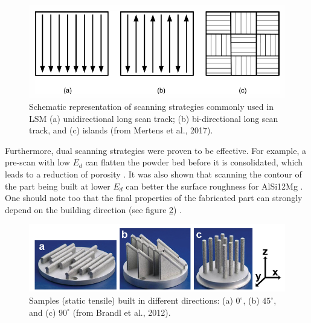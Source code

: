 \begin{figure}[h!]
\centering
\includegraphics[scale=0.6]{Images/Strat}
\decoRule
\caption[Schematic representation of scanning strategies commonly used in LSM (a) unidirectional long scan track; (b) bi-directional long scan track, and (c) islands]{Schematic representation of scanning strategies commonly used in LSM (a) unidirectional long scan track; (b) bi-directional long scan track, and (c) islands (from Mertens et al., 2017).}
\label{fig:Strat}
\end{figure}

Furthermore, dual scanning strategies were proven to be effective. For example, a pre-scan with low $E_d$ can flatten the powder bed before it is consolidated, which leads to a reduction of porosity \parencite{Mertens170406}. It was also shown that scanning the contour of the part being built at lower $E_d$ can better the surface roughness for AlSi12Mg \parencite{PRASHANTH170205}. One should note too that the final properties of the fabricated part can strongly depend on the building direction (see figure \ref{fig:Build}) \parencite{DELROISSE201732}.\\%

\begin{figure}[th]
\centering
\includegraphics[scale=0.58]{Images/Build}
\decoRule
\caption[Samples (static tensile) built in different directions: (a) $0^\circ$, (b) $45^\circ$, and (c) $90^\circ$]{Samples (static tensile) built in different directions: (a) $0^\circ$, (b) $45^\circ$, and (c) $90^\circ$ (from Brandl et al., 2012).}
\label{fig:Build}
\end{figure}


